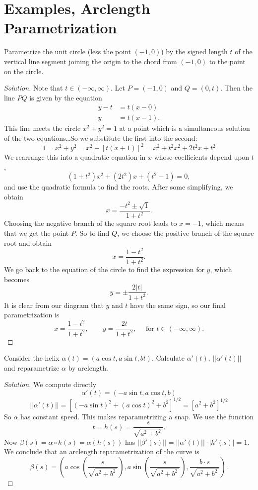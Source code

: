 \documentclass[Shifrin_Solutions_Spring_2015]{subfiles}
\begin{document}
\section{Examples, Arclength Parametrization}

\begin{exercise}
Parametrize the unit circle (less the point $(-1,0)$)  by the signed length $t$ of the vertical line segment joining the origin to the chord from $(-1,0)$ to the point on the circle.
\end{exercise}

\begin{proof}[Solution]
Note that $t \in (-\infty, \infty)$. Let $P = (-1,0)$ and $Q = (0,t)$. Then the line $PQ$ is given by the equation
\[
\begin{split}
y-t &= t ( x - 0) \\
 y & = t ( x-1).
\end{split}
\]
This line meets the circle $x^2  + y^2 = 1$ at a point which is a simultaneous solution of the two equations\dots So we substitute the first into the second:
\[
1 = x^2 + y^2 = x^2 + [t(x+1)]^2 = x^2 + t^2x^2 + 2t^2x + t^2
\]
We rearrange this into a quadratic equation in $x$ whose coefficients depend upon $t$,
\[
(1+t^2) x^2 + (2t^2) x + (t^2 - 1) = 0,
\]
and use the quadratic formula to find the roots. After some simplifying, we obtain
\[
x = \dfrac{-t^2 \pm \sqrt{1}}{1+t^2}.
\]
Choosing the negative branch of the square root leads to $x=-1$, which means that we get the point $P$. So to find $Q$, we choose the positive branch of the square root and obtain
\[
x = \dfrac{1-t^2}{1+t^2}.
\]
We go back to the equation of the circle to find the expression for $y$, which becomes
\[
y =\pm \dfrac{ 2|t|}{1+t^2}.
\]
It is clear from our diagram that $y$ and $t$ have the same sign, so our final parametrization is
\[
x = \dfrac{1-t^2}{1+t^2}, \qquad y = \dfrac{ 2t}{1+t^2}, \quad \mbox{ for } t \in (-\infty, \infty) .
\]
\end{proof}

\vfill
\pagebreak


\begin{exercise}
Consider the helix $\alpha(t) = ( a \cos t , a \sin t , b t )$. Calculate $\alpha'(t)$,
$||\alpha'(t)||$ and reparametrize $\alpha$ by arclength.
\end{exercise}

\begin{proof}[Solution] We compute directly
\[
\alpha'(t) = ( - a \sin t, a \cos t , b)
\]
\[
||\alpha'(t)|| = [ (-a\sin t)^2 + (a \cos t)^2 + b^2]^{1/2} = [a^2+b^2]^{1/2}
\]
So $\alpha$ has constant speed. This makes reparametrizing a snap. We use the function
\[
t = h(s) = \dfrac{s}{\sqrt{a^2 + b^2 \ }}.
\]
Now $\beta(s) = \alpha \circ h(s) = \alpha(h(s))$ has $||\beta'(s)|| = ||\alpha'(t)||\cdot |h'(s)| = 1$.
We conclude that an arclength reparametrization of the curve is
\[
\beta(s) = \left( a \cos \left(\dfrac{s}{\sqrt{a^2 + b^2 \ }}\right) , a \sin\left( \dfrac{s}{\sqrt{a^2 + b^2 \ }}\right) , \dfrac{b \cdot s}{\sqrt{a^2 + b^2 \ }} \right).
\]
\end{proof}
\end{document}
